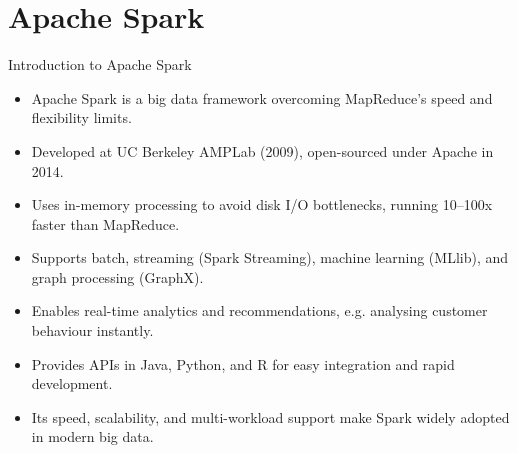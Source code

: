 \documentclass[aspectratio=169, table]{beamer}
\begin{document}
\section{Apache Spark}
\begin{frame}{Introduction to Apache Spark}
	\vspace{20pt}
	
	\begin{itemize}
		\item Apache Spark is a big data framework overcoming MapReduce’s speed and flexibility limits.
		
		\item Developed at UC Berkeley AMPLab (2009), open-sourced under Apache in 2014.
		
		\item Uses in-memory processing to avoid disk I/O bottlenecks, running 10–100x faster than MapReduce.
		
		\item Supports batch, streaming (Spark Streaming), machine learning (MLlib), and graph processing (GraphX).
		
		\item Enables real-time analytics and recommendations, e.g. analysing customer behaviour instantly.
		
		\item Provides APIs in Java, Python, and R for easy integration and rapid development.
		
		\item Its speed, scalability, and multi-workload support make Spark widely adopted in modern big data.
	\end{itemize}
	
\end{frame}
\end{document}
